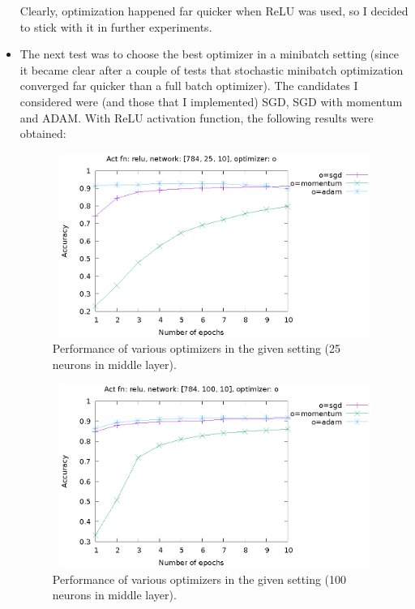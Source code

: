 \documentclass[12pt, a4paper]{article}
\begin{document}
\begin{itemize}
Clearly, optimization happened far quicker when ReLU was used, so I decided to stick with it in further experiments.

\item The next test was to choose the best optimizer in a minibatch setting (since it became clear after a couple of tests that stochastic minibatch optimization converged far quicker than a full batch optimizer). The candidates I considered were (and those that I implemented) SGD, SGD with momentum and ADAM. With ReLU activation function, the following results were obtained:

\begin{figure}[h!]
\centering
\includegraphics[width=12cm, height=6cm]{relu_25_opts.eps}
\caption{Performance of various optimizers in the given setting (25 neurons in middle layer). }
\end{figure}

\begin{figure}[h!]
\centering
\includegraphics[width=12cm, height=6cm]{relu_100_opts.eps}
\caption{Performance of various optimizers in the given setting (100 neurons in middle layer). }
\end{figure}


\end{itemize}
\end{document}
